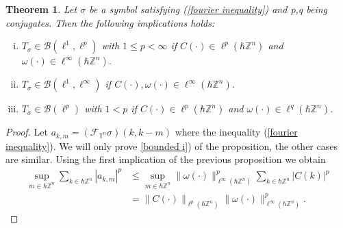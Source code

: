 \documentclass[pdflatex,sn-mathphys-num]{sn-jnl}%
\theoremstyle{thmstyleone}%
\newtheorem{theorem}{Theorem}
\theoremstyle{thmstyletwo}%
\theoremstyle{thmstylethree}%
\begin{document}
\begin{theorem}\label{Theorem bounded}
    Let $\sigma$ be a symbol satisfying (\ref{fourier inequality}) and p,q being conjugates. Then the following implications holds:
    \begin{enumerate}[(i)]
        \item $T_\sigma\in\mathcal{B}(\ell^1,\ell^p)$ with $1\leq p<\infty$ if $C(\cdot)\in\ell^p(\hbar\mathbb{Z}^n)$ and $\omega(\cdot)\in\ell^\infty(\hbar\mathbb{Z}^n)$.\label{bounded i}
        \item $T_\sigma\in\mathcal{B}(\ell^1,\ell^\infty)$ if $C(\cdot),\omega(\cdot)\in\ell^\infty(\hbar\mathbb{Z}^n)$.\label{bounded ii}
        \item $T_\sigma\in\mathcal{B}(\ell^p)$ with $1< p$ if $C(\cdot)\in\ell^p(\hbar\mathbb{Z}^n)$ and $\omega(\cdot)\in\ell^q(\hbar\mathbb{Z}^n)$.\label{bounded iv}
     \end{enumerate}
\end{theorem}
\begin{proof}
    Let $a_{k,m}=(\mathcal{F}_{\mathbb{T}^n}\sigma)(k,k-m)$ where the inequality (\ref{fourier inequality}). We will only prove \ref{bounded i}) of the proposition, the other cases are similar. Using the first implication of the previous proposition we obtain
    \begin{align*}
    \sup_{m\in\hbar\mathbb{Z}^n} \sum_{k\in\hbar\mathbb{Z}^n} |a_{k,m}|^p &\leq \sup_{m\in\hbar\mathbb{Z}^n} \|\omega(\cdot)\|_{\ell^\infty(\hbar\mathbb{Z}^n)}^p \sum_{k\in\hbar\mathbb{Z}^n} |C(k)|^p \\
    &=\|C(\cdot) \|_{\ell^p(\hbar\mathbb{Z}^n)} \|\omega(\cdot)\|_{\ell^\infty(\hbar\mathbb{Z}^n)}^p.    
    \end{align*}
\end{proof}
\end{document}
